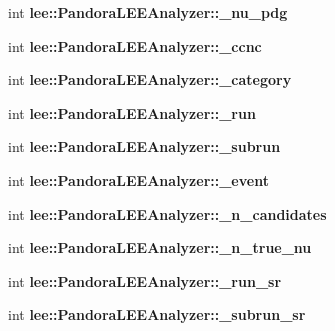 \begin{DoxyCompactItemize}
\item 
\hypertarget{group__lee_gaf5459aca7400b6346a489d293ffea411}{int {\bfseries lee\-::\-Pandora\-L\-E\-E\-Analyzer\-::\-\_\-nu\-\_\-pdg}}\label{group__lee_gaf5459aca7400b6346a489d293ffea411}

\item 
\hypertarget{group__lee_gaae937bb4d388fd91a62a76e251c56c93}{int {\bfseries lee\-::\-Pandora\-L\-E\-E\-Analyzer\-::\-\_\-ccnc}}\label{group__lee_gaae937bb4d388fd91a62a76e251c56c93}

\item 
\hypertarget{group__lee_gac54ac47f84c33553e01edb0419d78570}{int {\bfseries lee\-::\-Pandora\-L\-E\-E\-Analyzer\-::\-\_\-category}}\label{group__lee_gac54ac47f84c33553e01edb0419d78570}

\item 
\hypertarget{group__lee_ga7afce927e448af59dc3f03f6e2fcb911}{int {\bfseries lee\-::\-Pandora\-L\-E\-E\-Analyzer\-::\-\_\-run}}\label{group__lee_ga7afce927e448af59dc3f03f6e2fcb911}

\item 
\hypertarget{group__lee_ga566cffa1b58c7fc0566e696c6c8b8268}{int {\bfseries lee\-::\-Pandora\-L\-E\-E\-Analyzer\-::\-\_\-subrun}}\label{group__lee_ga566cffa1b58c7fc0566e696c6c8b8268}

\item 
\hypertarget{group__lee_gac635405f52f430a32515f06447b98ade}{int {\bfseries lee\-::\-Pandora\-L\-E\-E\-Analyzer\-::\-\_\-event}}\label{group__lee_gac635405f52f430a32515f06447b98ade}

\item 
\hypertarget{group__lee_gab3b7dc079f30897ba737c933e4905b76}{int {\bfseries lee\-::\-Pandora\-L\-E\-E\-Analyzer\-::\-\_\-n\-\_\-candidates}}\label{group__lee_gab3b7dc079f30897ba737c933e4905b76}

\item 
\hypertarget{group__lee_ga4c4794a897538d3307008962f0b96315}{int {\bfseries lee\-::\-Pandora\-L\-E\-E\-Analyzer\-::\-\_\-n\-\_\-true\-\_\-nu}}\label{group__lee_ga4c4794a897538d3307008962f0b96315}

\item 
\hypertarget{group__lee_gae9a94b51ad7618349eee1115c170679d}{int {\bfseries lee\-::\-Pandora\-L\-E\-E\-Analyzer\-::\-\_\-run\-\_\-sr}}\label{group__lee_gae9a94b51ad7618349eee1115c170679d}

\item 
\hypertarget{group__lee_gaba4424e8079da9de241fdd61d648a7f5}{int {\bfseries lee\-::\-Pandora\-L\-E\-E\-Analyzer\-::\-\_\-subrun\-\_\-sr}}\label{group__lee_gaba4424e8079da9de241fdd61d648a7f5}


\end{DoxyCompactItemize}
